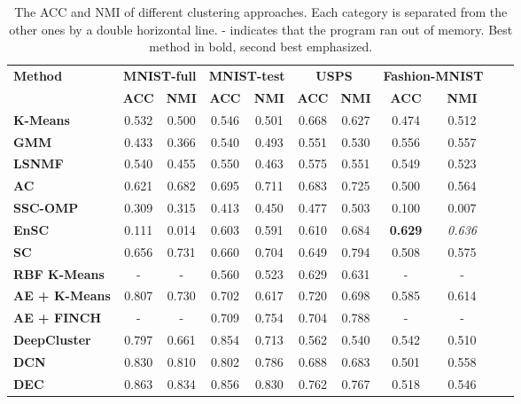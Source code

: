 \documentclass{article}
\begin{document}
\begin{table}[h!]
  \caption{The ACC and NMI of different clustering approaches. Each category is separated from the other ones by a double horizontal line. {-} indicates that the program ran out of memory. Best method in bold, second best emphasized.}
  \vskip 0.01in 
  \begin{center}
  \begin{small}
  \begin{tabular}{|p{3cm}|c|c|c|c|c|c|c|c|c|c|}
    \hline
    {\textbf{Method}} & \multicolumn{2}{c|}{\textbf{MNIST-full}} & \multicolumn{2}{c|}{\textbf{MNIST-test}} & \multicolumn{2}{c|}{\textbf{USPS}} & \multicolumn{2}{c|}{\textbf{Fashion-MNIST}}\\
\cline{2-9}
    & \textbf{ACC} & \textbf{NMI} & \textbf{ACC} & \textbf{NMI} & \textbf{ACC} & \textbf{NMI} & \textbf{ACC} & \textbf{NMI} \\ \hline
    \textbf{K-Means} & 0.532 & 0.500 & 0.546 & 0.501 & 0.668 & 0.627 & 0.474 & 0.512 \\ \hline
    \textbf{GMM} & 0.433 & 0.366 & 0.540 & 0.493 & 0.551 & 0.530 & 0.556 & 0.557 \\ \hline
    \textbf{LSNMF} & 0.540 & 0.455 & 0.550 & 0.463  & 0.575 & 0.551 & 0.549 & 0.523 \\ \hline 
    \textbf{AC} & 0.621 & 0.682 & 0.695 & 0.711 & 0.683 & 0.725 & 0.500 & 0.564 \\ \hline \hline
    \textbf{SSC-OMP} & 0.309 & 0.315 & 0.413 & 0.450 & 0.477 & 0.503 & 0.100 & 0.007 \\ \hline
    \textbf{EnSC} & 0.111 & 0.014 & 0.603 & 0.591 & 0.610 & 0.684 & \textbf{0.629} & \textit{0.636} \\ \hline \hline
    \textbf{SC} & 0.656 & 0.731 & 0.660 & 0.704 & 0.649 & 0.794 & 0.508 & 0.575  \\ \hline
    \textbf{RBF K-Means} & {-} & {-} & 0.560 & 0.523 & 0.629 & 0.631 & {-} & {-}  \\ \hline \hline
    \textbf{AE + K-Means} & 0.807 & 0.730 & 0.702 & 0.617 & 0.720 & 0.698 & 0.585 & 0.614\\ \hline
    \textbf{AE + FINCH} & {-} & {-} & 0.709 & 0.754 & 0.704 & 0.788 & {-} & {-}  \\ \hline 
    \textbf{DeepCluster} & 0.797 & 0.661 & 0.854 & 0.713 & 0.562 & 0.540 & 0.542  & 0.510  \\ \hline
    \textbf{DCN} & 0.830 & 0.810 & 0.802 & 0.786 & 0.688 & 0.683  & 0.501 & 0.558  \\ \hline 
    \textbf{DEC} & 0.863 & 0.834 & 0.856 & 0.830 & 0.762 & 0.767 & 0.518 & 0.546 \\ \hline

\end{tabular}
\end{small}
\end{center}
\end{table}
\end{document}
